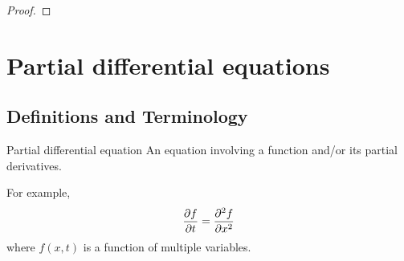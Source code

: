 \begin{proof}

\end{proof}
\pagebreak

\section{Partial differential equations}
\subsection{Definitions and Terminology}
\begin{defn}{Partial differential equation}{}
An equation involving a function and/or its partial derivatives. 
\end{defn}

For example, \[ \pdv{f}{t}=\pdv[order={2}]{f}{x} \]
where $f(x,t)$ is a function of multiple variables.

